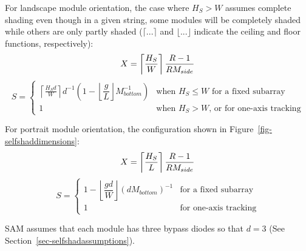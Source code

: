 \documentclass[12pt,letterpaper]{article}
\begin{document}
For landscape module orientation, the case where $H_S>W$ assumes complete shading even though in a given string, some modules will be completely shaded while others are only partly shaded ($\lceil...\rceil$ and $\lfloor...\rfloor$ indicate the ceiling and floor functions, respectively): 
\begin{equation}
X = \left\lceil\frac{H_S}{W}\right\rceil \dfrac{R-1}{R M_{side}}\notag
\end{equation}
\begin{equation}\label{eqn-ssdimland}
S=
  \left\{
    \begin{array}{ll}
      \left\lceil \frac{H_S d}{W} \right
      \rceil d^{-1} 
      \left(1-\left\lfloor\dfrac{g}{L}\right\rfloor M^{-1}_{bottom}\right) 
      & \mbox{when $H_S\le W$ for a fixed subarray}\\
      1 
      & \mbox{when $H_S> W$, or for one-axis tracking}
    \end{array}
  \right.
\end{equation}

For portrait module orientation, the configuration shown in Figure~\ref{fig-selfshaddimensions}: 
\begin{equation}
X = \left\lceil \frac{H_S}{L} \right\rceil \dfrac{R-1}{R M_{side}}\notag
\end{equation}
\begin{equation}\label{eqn-ssdimport}
S=
 \left\{
     \begin{array}{ll}
      1-\left\lfloor \dfrac{gd}{W}\right\rfloor \left(d M_{bottom}\right)^{-1} 
      & \mbox{for a fixed subarray}\\
      1 
      & \mbox{for one-axis tracking}
    \end{array}
  \right.
\end{equation}


SAM assumes that each module has three bypass diodes so that $d=3$ (See  Section~\ref{sec-selfshadassumptions}).

\end{document}
